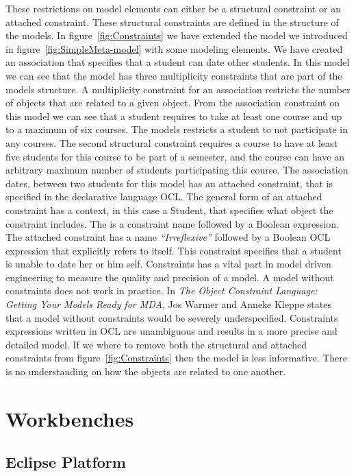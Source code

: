 These restrictions on model elements can either be a structural constraint or an
attached constraint. These structural constraints are defined in the structure
of the models. In figure~\ref{fig:Constraints} we have extended the model we
introduced in figure~\ref{fig:SimpleMeta-model} with some  modeling elements. We
have created an association that specifies that a student can date other
students. In this model we can see that the model has three multiplicity
constraints that are part of the models structure. A multiplicity constraint for
an association restricts the number of objects that are related to a given
object. From the association constraint on this model we can see that a student
requires to take at least one course and up to a maximum of six courses. The
models restricts a student to not participate in any courses. The second
structural constraint requires a course to have at least five students for
this course to be part of a semester, and the course can have an arbitrary
maximum number of students participating this course. The association dates,
between two students for this model has an attached constraint, that is
specified in the declarative language OCL. The general form of an attached
constraint has a context, in this case a Student, that specifies what object the
constraint includes. The is a constraint name followed by a Boolean
expression. The attached constraint has a name \textit{``Irreflexive''} followed
by a Boolean OCL expression that explicitly refers to itself. This constraint
specifies that a student is unable to date her or him self. Constraints has a
vital part in model driven engineering to measure the quality and precision of a
model. A model without constraints does not work in practice. In
\textit{The Object Constraint Language: Getting Your Models Ready for
MDA}\cite{Warmer:2003:OCL:861416}, Jos Warmer and Anneke Kleppe states that a
model without constraints would be severely underspecified. Constraints
expressions written in OCL are unambiguous and results in a more precise and
detailed model. If we where to remove both the structural and attached
constraints from figure~\ref{fig:Constraints} then the model is less
informative. There is no understanding on how the objects are related to
one another. 

\section{Workbenches}

\subsection{Eclipse Platform}

